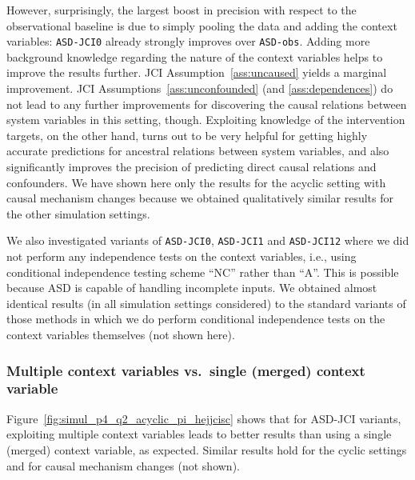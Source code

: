 \documentclass[twoside,11pt]{article}
\newcommand{\alg}[1]{\texttt{#1}}
\begin{document}
However, surprisingly, the largest boost in precision with respect to the observational baseline
is due to simply pooling the data and adding
the context variables: \alg{ASD-JCI0} already strongly improves over \alg{ASD-obs}.
Adding more background knowledge regarding the nature of the context variables helps to improve 
the results further. JCI Assumption~\ref{ass:uncaused} yields a marginal improvement. JCI 
Assumptions~\ref{ass:unconfounded} (and \ref{ass:dependences}) do not lead to any 
further improvements for discovering the causal relations between system variables in this setting, though. 
Exploiting knowledge of the intervention targets, on the other hand, turns out to be very 
helpful for getting highly accurate predictions for ancestral relations between system variables, 
and also significantly improves the precision of predicting direct causal relations and confounders.
We have shown here only the results for the acyclic setting with causal
mechanism changes because we obtained qualitatively similar results for the other simulation settings.

We also investigated variants of \alg{ASD-JCI0}, \alg{ASD-JCI1} and
\alg{ASD-JCI12} where we did not perform any independence tests on the context
variables, i.e., using conditional independence testing scheme ``NC'' rather
than ``A''. This is possible because ASD is capable of handling
incomplete inputs. We obtained almost identical results (in all simulation
settings considered) to the standard variants of those methods in which we do
perform conditional independence tests on the context variables themselves (not
shown here).



\subsubsection{Multiple context variables vs.\ single (merged) context variable}

Figure~\ref{fig:simul_p4_q2_acyclic_pi_hejjcisc} shows that for ASD-JCI variants, exploiting multiple 
context variables leads to better results than using a single (merged) context variable, as expected. Similar
results hold for the cyclic settings and for causal mechanism changes (not shown).
\end{document}
